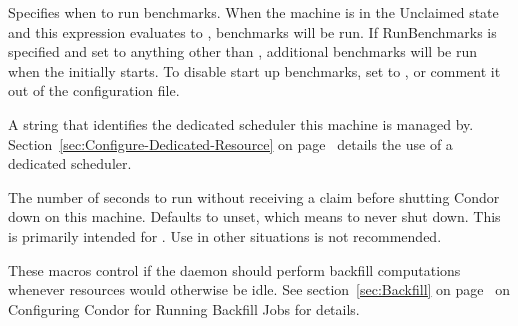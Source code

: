 \begin{description}
\label{param:RunBenchmarks}
\item[\Macro{RUNBENCHMARKS}]
  Specifies when to run benchmarks.
  When the machine is in the Unclaimed state and this expression
  evaluates to , benchmarks will be run.
  If RunBenchmarks is specified and set to anything other than ,
  additional benchmarks will be run when the  initially starts.
  To disable start up benchmarks, set  to ,
  or comment it out of the configuration file.

\label{param:DedicatedScheduler}
\item[\Macro{DedicatedScheduler}]
  A string that identifies the dedicated scheduler this machine is managed by.
  Section~\ref{sec:Configure-Dedicated-Resource}
  on page~\pageref{sec:Configure-Dedicated-Resource} details the use of
  a dedicated scheduler.

\label{param:StartdNoclaimShutdown}
\item[\Macro{STARTD\_NOCLAIM\_SHUTDOWN}]
  The number of seconds to run without receiving a claim before
  shutting Condor down on this machine.  Defaults to unset, which
  means to never shut down.  This is primarily intended for .
  Use in other situations is not recommended.

\end{description}

These macros control if the  daemon should perform
backfill computations whenever resources would otherwise be idle.  
See section~\ref{sec:Backfill} on page~\pageref{sec:Backfill} on
Configuring Condor for Running Backfill Jobs for details.

